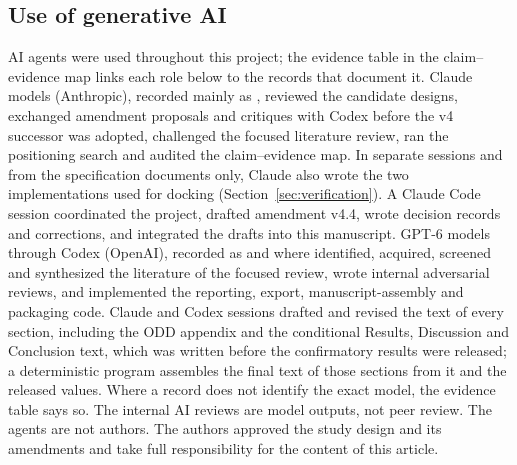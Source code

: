\subsection{Use of generative AI}

AI agents were used throughout this project; the evidence table in the claim--evidence map links each role below to the records that document it. %
Claude models (Anthropic), recorded mainly as , reviewed the candidate designs, exchanged amendment proposals and critiques with Codex before the v4 successor was adopted, challenged the focused literature review, ran the positioning search and audited the claim--evidence map. %
In separate sessions and from the specification documents only, Claude also wrote the two implementations used for docking (Section~\ref{sec:verification}). A Claude Code session coordinated the project, drafted amendment v4.4, wrote decision records and corrections, and integrated the drafts into this manuscript. %
GPT-6 models through Codex (OpenAI), recorded as  and  where identified, acquired, screened and synthesized the literature of the focused review, wrote internal adversarial reviews, and implemented the reporting, export, manuscript-assembly and packaging code. %
Claude and Codex sessions drafted and revised the text of every section, including the ODD appendix and the conditional Results, Discussion and Conclusion text, which was written before the confirmatory results were released; a deterministic program assembles the final text of those sections from it and the released values. %
Where a record does not identify the exact model, the evidence table says so. The internal AI reviews are model outputs, not peer review. %
The agents are not authors. The authors approved the study design and its amendments and take full responsibility for the content of this article. %
